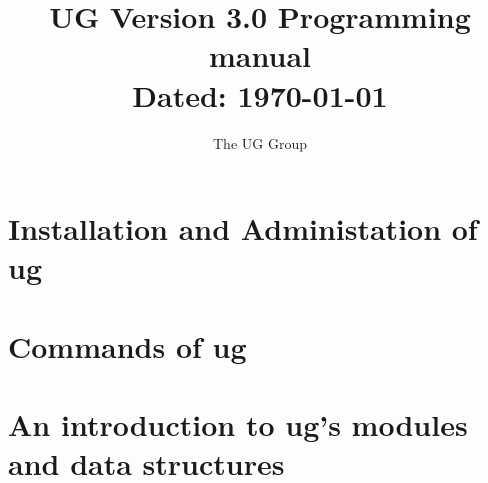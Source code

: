 


\pagestyle{myheadings}
\sloppy
\makeindex


\newcommand{\sectitle}{\mbox{}}
\setcounter{page}{0}

\title{UG Version 3.0 Programming manual\\
       Dated: \today}
\author{The UG Group}
\maketitle
{
\small
\tableofcontents
}
\clearpage

\pagestyle{plain}
\section{Installation and Administation of ug}
\renewcommand{\sectitle}{Installation and Administation}


\pagestyle{plain}
\section{Commands of ug}
\renewcommand{\sectitle}{Commands}


\pagestyle{plain}
\section{An introduction to ug's modules and data structures}
\renewcommand{\sectitle}{modules and data structures}



